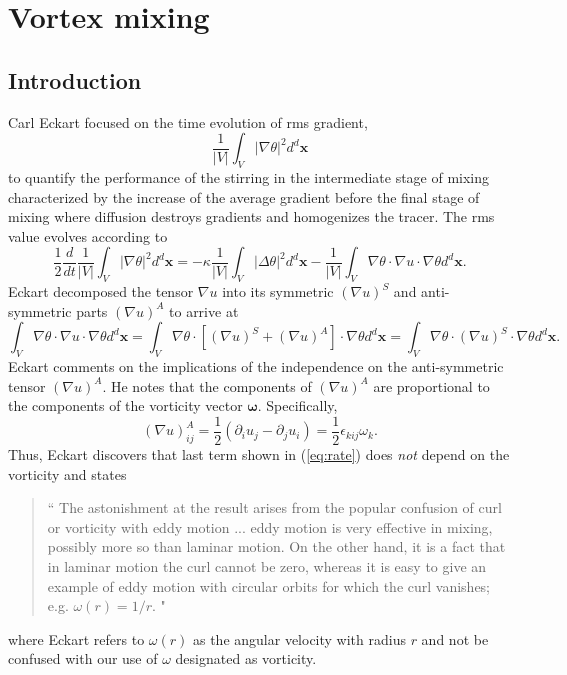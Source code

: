 
\section{Vortex mixing}
\subsection{Introduction}
Carl Eckart \cite{Eckart1948} focused on the time evolution of rms gradient,
\begin{equation}
\frac{1}{|V|}\int_{V} |\nabla \theta |^{2} d^{d}\mathbf{x}
\end{equation}
to quantify the performance of the stirring in the intermediate stage of mixing characterized by the increase of the average gradient before the final stage of mixing where diffusion destroys gradients and homogenizes the tracer. The rms value evolves according to 
\begin{equation}
\label{eq:rate}
\frac{1}{2}\frac{d}{dt}\frac{1}{|V|}\int_{V} |\nabla \theta |^{2} d^{d}\mathbf{x} = - \kappa \frac{1}{|V|} \int_{V} |\Delta \theta |^{2} d^{d}\mathbf{x}  - \frac{1}{|V|} \int_{V} \nabla \theta \cdot \nabla u \cdot \nabla \theta  d^{d}\mathbf{x}.
\end{equation}
Eckart decomposed the tensor $\nabla u$  into its symmetric $(\nabla u)^{S}$ and anti-symmetric parts $(\nabla u)^{A}$ to arrive at
\begin{equation}
  \int_{V} \nabla \theta \cdot \nabla u \cdot \nabla \theta  d^{d}\mathbf{x} =   \int_{V} \nabla \theta \cdot [(\nabla u)^{S} + (\nabla u)^{A} ] \cdot \nabla \theta  d^{d}\mathbf{x} = \int_{V} \nabla \theta \cdot (\nabla u)^{S}  \cdot \nabla \theta  d^{d}\mathbf{x}.
\end{equation}
Eckart comments on the implications of the independence on the anti-symmetric tensor $(\nabla u)^{A}$. He notes that the components of $(\nabla u)^{A}$ are proportional to the components of the vorticity vector $\mathbf{\omega}$. Specifically, 
\begin{equation}
(\nabla u)^{A}_{ij}=\frac{1}{2}\left(\partial_{i}u_{j}-\partial_{j}u_{i}\right)=\frac{1}{2}\epsilon_{kij}\omega_{k}.
\end{equation}
Thus, Eckart discovers that last term shown in (\ref{eq:rate}) does {\it not} depend on the vorticity and states
\begin{quote}
`` The astonishment at the result arises from the popular confusion of curl or vorticity with eddy motion ...  eddy motion is very effective in mixing, possibly more so than laminar motion. On the other hand, it is a fact that in laminar motion the curl cannot be zero, whereas it is easy to give an example of eddy motion with circular orbits for which the curl vanishes; e.g. $\omega(r) =1/r$. "
\end{quote} 
where Eckart refers to $\omega(r)$ as the angular velocity with radius $r$ and not be confused with our use of $\omega$ designated as vorticity.

